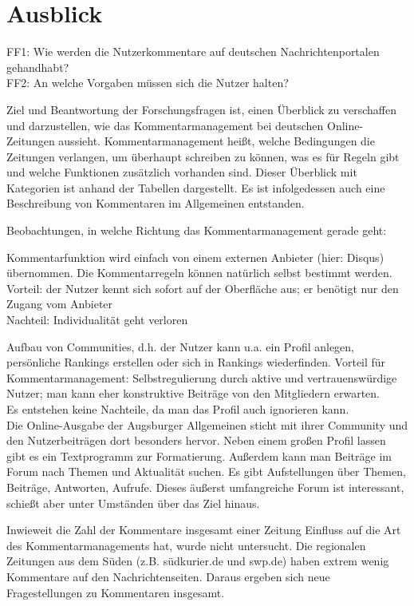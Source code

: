 \chapter{Ausblick}

FF1: Wie werden die Nutzerkommentare auf deutschen Nachrichtenportalen
gehandhabt?\\
FF2: An welche Vorgaben müssen sich die Nutzer halten?

Ziel und Beantwortung der Forschungsfragen ist, einen Überblick zu verschaffen und darzustellen, wie das Kommentarmanagement bei deutschen Online-Zeitungen aussieht. Kommentarmanagement heißt, welche Bedingungen die Zeitungen verlangen, um überhaupt schreiben zu können, was es für Regeln gibt und welche Funktionen zusätzlich vorhanden sind. Dieser Überblick mit Kategorien ist anhand der Tabellen dargestellt. 
Es ist infolgedessen auch eine Beschreibung von Kommentaren im Allgemeinen entstanden.


Beobachtungen, in welche Richtung das Kommentarmanagement gerade geht:

Kommentarfunktion wird einfach von einem externen Anbieter (hier: Disqus) übernommen. Die Kommentarregeln können natürlich selbst bestimmt werden. \\
Vorteil: der Nutzer kennt sich sofort auf der Oberfläche aus; er benötigt nur den Zugang vom Anbieter\\
Nachteil: Individualität geht verloren


Aufbau von Communities, d.h. der Nutzer kann u.a. ein Profil anlegen, persönliche Rankings erstellen oder sich in Rankings wiederfinden.
Vorteil für Kommentarmanagement: Selbstregulierung durch aktive und vertrauenswürdige Nutzer; man kann eher konstruktive Beiträge von den Mitgliedern erwarten. \\
Es entstehen keine Nachteile, da man das Profil auch ignorieren kann.\\
Die Online-Ausgabe der Augsburger Allgemeinen sticht mit ihrer Community und den Nutzerbeiträgen dort besonders hervor. Neben einem großen Profil lassen gibt es ein Textprogramm zur Formatierung. Außerdem kann man Beiträge im Forum nach Themen und Aktualität suchen. Es gibt Aufstellungen über Themen, Beiträge, Antworten, Aufrufe. Dieses äußerst umfangreiche Forum ist interessant, schießt aber unter Umständen über das Ziel hinaus. 

Inwieweit die Zahl der Kommentare insgesamt einer Zeitung Einfluss auf die Art des Kommentarmanagements hat, wurde nicht
untersucht. Die regionalen Zeitungen aus dem Süden (z.B. südkurier.de und swp.de) haben extrem wenig Kommentare auf den
Nachrichtenseiten. Daraus ergeben sich neue Fragestellungen zu Kommentaren insgesamt.

